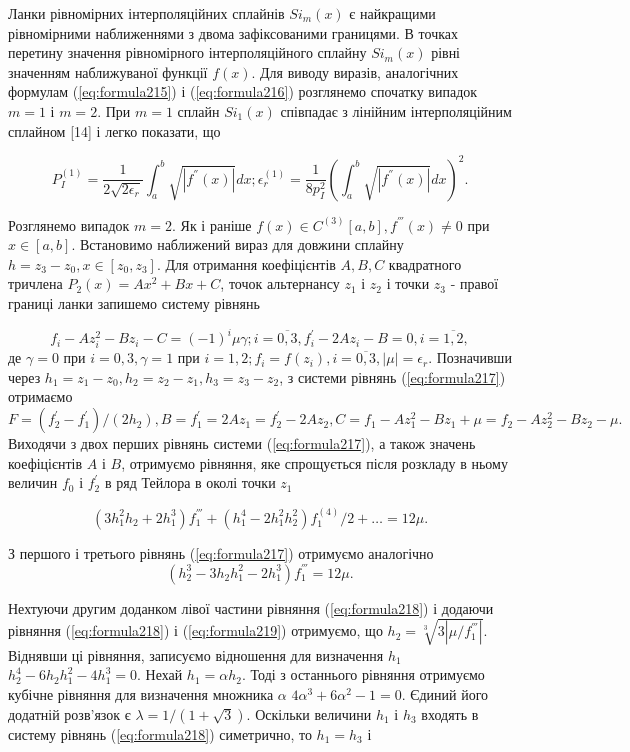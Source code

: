 \documentclass[ukrainian,14pt]{extarticle}
\begin{document}
Ланки рівномірних інтерполяційних сплайнів $Si_m(x)$ є найкращими рівномірними наближеннями з двома зафіксованими границями. В точках перетину значення рівномірного інтерполяційного сплайну $Si_m(x)$ рівні значенням наближуваної функції $f(x)$. Для виводу виразів, аналогічних формулам (\ref{eq:formula215}) і (\ref{eq:formula216}) розглянемо спочатку випадок $m = 1$ і $m = 2$. При $m = 1$ сплайн $Si_1(x)$ співпадає з лінійним інтерполяційним сплайном [14] і легко показати, що

$$P^{(1)}_I = \frac{1}{2\sqrt{2\epsilon_r}} \int_a^b \sqrt{|f^{''}(x)|}dx; \epsilon^{(1)}_r = \frac{1}{8p_{I}^2} \left(\int_a^b \sqrt{|f^{''}(x)|}dx \right)^2.$$

Розглянемо випадок $m = 2$. Як і раніше $f(x) \in C^{(3)} [a, b], f^{'''}(x) \neq 0$ при $x \in [a, b]$. Встановимо наближений вираз для довжини сплайну $h  = z_3 - z_0, x \in [z_0, z_3].$ Для отримання коефіцієнтів $A, B, C$ квадратного тричлена $P_2(x) = Ax^2 + Bx + C$, точок альтернансу $z_1$ і $z_2$ і точки $z_3$ - правої границі ланки запишемо систему рівнянь

\begin{equation}\label{eq:formula217}
    f_i - Az_i^2 - Bz_i - C = (-1)^i \mu \gamma; i = \overline{0, 3}, f^'_i - 2Az_i - B = 0, i = \overline{1,2},
\end{equation}
де $\gamma = 0$ при $i = 0, 3, \gamma = 1$ при $i = 1,2; f_i = f(z_i), i = \overline{0, 3}, |\mu| = \epsilon_r$. Позначивши через $h_1 = z_1 - z_0, h_2 = z_2 - z_1, h_3 = z_3 - z_2$, з системи рівнянь (\ref{eq:formula217}) отримаємо
$$F = (f^{'}_2 - f^{'}_1) / (2h_2), B = f^'_1 = 2Az_1 = f^'_2 - 2Az_2, C = f_1 - Az_1^2 - Bz_1 + \mu = f_2 - Az_2^2 - Bz_2 - \mu.$$
Виходячи з двох перших рівнянь системи (\ref{eq:formula217}), а також значень коефіцієнтів $A$ і $B$, отримуємо рівняння, яке спрощується після розкладу в ньому величин $f_0$ і $f^'_2$ в ряд Тейлора в околі точки $z_1$

\begin{equation}\label{eq:formula218}
  (3h_1^2 h_2 + 2h_1^3)f^{'''}_1 + (h_1^4 - 2h_1^2 h_2^2) f^{(4)}_1 / 2 + \ldots = 12 \mu.  
\end{equation}

З першого і третього рівнянь (\ref{eq:formula217}) отримуємо аналогічно
\begin{equation}\label{eq:formula219}
 (h_2^3 - 3h_2h_1^2 - 2h_1^3)f^{'''}_1 = 12\mu.
\end{equation}

Нехтуючи другим доданком лівої частини рівняння (\ref{eq:formula218}) і додаючи рівняння (\ref{eq:formula218}) і (\ref{eq:formula219}) отримуємо, що $h_2 = \sqrt[3]{3|\mu/f^{'''}_1|}$. Віднявши ці рівняння, записуємо відношення для визначення $h_1$ $h_2^4 - 6h_2 h_1^2 - 4h_1^3 = 0$. Нехай $h_1 = \alpha h_2$. Тоді з останнього рівняння отримуємо кубічне рівняння для визначення множника $\alpha$ $4\alpha^3 + 6\alpha^2 - 1 = 0$. Єдиний його додатній розв'язок є $\lambda = 1 / (1 + \sqrt{3})$. Оскільки величини $h_1$ і $h_3$ входять в систему рівнянь (\ref{eq:formula218}) симетрично, то $h_1 = h_3$ і 
\end{document}
